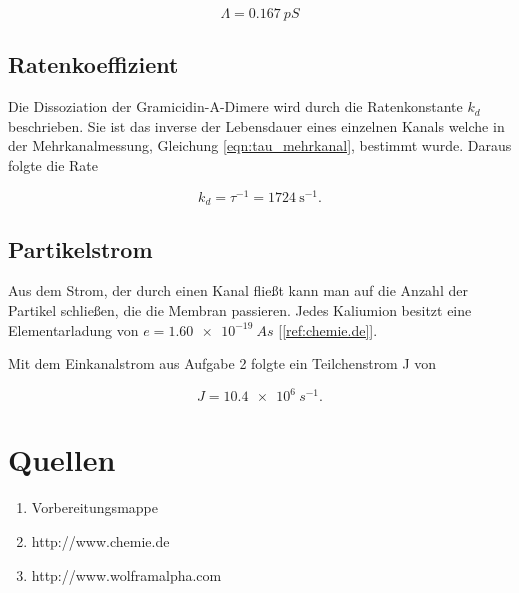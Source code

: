 \documentclass[a4paper,ngerman]{scrartcl}
\begin{document}
\begin{equation}
\label{eqn:Einkanal-leit}
\Lambda = \SI{0.167}{pS}
\end{equation}

\subsection{Ratenkoeffizient}

Die Dissoziation der Gramicidin-A-Dimere wird durch die Ratenkonstante $k_d$ beschrieben. Sie ist das inverse der Lebensdauer eines einzelnen Kanals welche in der Mehrkanalmessung, Gleichung \ref{eqn:tau_mehrkanal}, bestimmt wurde. Daraus folgte die Rate

\begin{equation}
k_d = \tau^{-1} = \SI[per-mode=symbol]{1724}{\second ^{-1}}.
\end{equation}

\subsection{Partikelstrom}

Aus dem Strom, der durch einen Kanal fließt kann man auf die Anzahl der Partikel schließen, die die Membran passieren. Jedes Kaliumion besitzt eine Elementarladung von $e = \SI{1.60e-19}{As}$ [\ref{ref:chemie.de}].

Mit dem Einkanalstrom aus Aufgabe 2 folgte ein Teilchenstrom J von

\begin{equation}
J = \SI{10.4e6}{s^{-1}}.
\end{equation}



\clearpage
\section{Quellen}
\begin{enumerate}
\item Vorbereitungsmappe \label{ref:mappe}
\item http://www.chemie.de \label{ref:chemie.de}
\item http://www.wolframalpha.com \label{ref:wolfram}
\end{enumerate}
\end{document}
